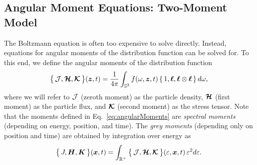 \subsection{Angular Moment Equations: Two-Moment Model}

The Boltzmann equation is often too expensive to solve directly.  
Instead, equations for angular moments of the distribution function can be solved for.  
To this end, we define the angular moments of the distribution function
\begin{equation}
  \big\{\,\mathcal{J},\boldsymbol{\mathcal{H}},\boldsymbol{\mathcal{K}}\,\big\}(\boldsymbol{z},t)
  =\frac{1}{4\pi}\int_{\mathbb{S}^{2}}f(\omega,\boldsymbol{z},t)\,\{\,1,\boldsymbol{\ell},\boldsymbol{\ell}\otimes\boldsymbol{\ell}\,\}\,d\omega,
  \label{eq:angularMoments}
\end{equation}
where we will refer to $\mathcal{J}$ (zeroth moment) as the particle density, $\boldsymbol{\mathcal{H}}$ (first moment) as the particle flux, and $\boldsymbol{\mathcal{K}}$ (second moment) as the stress tensor.  
Note that the moments defined in Eq.~\eqref{eq:angularMoments} are \emph{spectral moments} (depending on energy, position, and time).  
The \emph{grey moments} (depending only on position and time) are obtained by integration over energy as
\begin{equation}
  \big\{\,J,\boldsymbol{H},\boldsymbol{K}\,\big\}(\boldsymbol{x},t)
  =\int_{\mathbb{R}^{+}}\big\{\,\mathcal{J},\boldsymbol{\mathcal{H}},\boldsymbol{\mathcal{K}}\,\big\}(\varepsilon,\boldsymbol{x},t)\,\varepsilon^{2}d\varepsilon.  
\end{equation}

